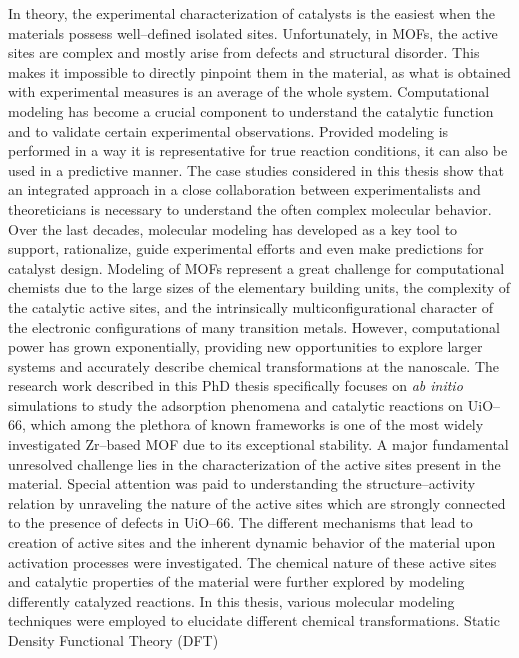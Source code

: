 \npar
In theory, the experimental characterization of catalysts is the easiest when
the materials possess well--defined isolated sites. Unfortunately, in MOFs, the
active sites are complex and mostly arise from defects and structural disorder.
This makes it impossible to directly pinpoint them in the material, as what
is obtained with experimental measures is an average of the whole system.
Computational modeling has become a crucial component to understand the catalytic function and to validate certain experimental observations. Provided modeling is performed in a way it is representative for true reaction conditions, it can also be used in a predictive manner. The case studies considered in this thesis show that an integrated approach in a close collaboration between experimentalists and theoreticians is necessary to understand the often complex molecular behavior.
\npar
Over the last decades, molecular modeling has developed as a key tool to
support, rationalize, guide experimental efforts and even make predictions for catalyst design. Modeling of MOFs represent a great challenge for computational chemists due to the large sizes of the elementary building units, the complexity of the catalytic active sites, and the intrinsically multiconfigurational character of the electronic configurations of many transition metals. However, computational power has grown exponentially, providing new opportunities to explore larger systems and accurately describe chemical transformations at the nanoscale.
\npar
The research work described in this PhD thesis specifically focuses on
\textit{ab initio} simulations to study the adsorption phenomena and catalytic
reactions on UiO--66, which among the plethora of known frameworks is one of the
most widely investigated Zr--based MOF due to its exceptional stability. A major
fundamental unresolved challenge lies in the characterization of the active
sites present in the material. Special attention was paid to understanding the structure--activity relation by unraveling the nature of the active sites which are strongly connected to the presence of defects in UiO--66. The different mechanisms that lead to creation of active sites and the inherent dynamic behavior of the material upon activation processes were investigated. The chemical nature of these active sites and catalytic properties of the material were further explored by modeling differently catalyzed reactions.
\npar
In this thesis, various molecular modeling techniques were employed to elucidate
different chemical transformations. Static Density Functional Theory (DFT)
